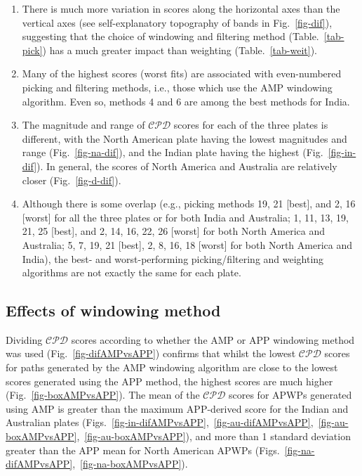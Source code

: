 \begin{enumerate}
  \item There is much more variation in scores along the horizontal axes than
	the vertical axes (see self-explanatory topography of bands in
	Fig.~\ref{fig-dif}), suggesting that the choice of windowing and filtering
	method (Table.~\ref{tab-pick}) has a much greater impact than weighting
	(Table.~\ref{tab-weit}).
  \item Many of the highest scores (worst fits) are associated with
	even-numbered picking and filtering methods, i.e., those which use the AMP
	windowing algorithm. Even so, methods 4 and 6 are among the best methods for
	India.
  \item The magnitude and range of $\mathcal{CPD}$ scores for each of the three
	plates is different, with the North American plate having the lowest
	magnitudes and range (Fig.~\ref{fig-na-dif}), and the Indian plate having
	the highest (Fig.~\ref{fig-in-dif}). In general, the scores of North America
	and Australia are relatively closer (Fig.~\ref{fig-d-dif}).
  \item Although there is some overlap (e.g., picking methods 19, 21 [best], and
	2, 16 [worst] for all the three plates or for both India and Australia; 1,
	11, 13, 19, 21, 25 [best], and 2, 14, 16, 22, 26 [worst] for both North
	America and Australia; 5, 7, 19, 21 [best], 2, 8, 16, 18 [worst] for both
	North America and India), the best- and worst-performing picking/filtering
	and weighting algorithms are not exactly the same for each plate.
\end{enumerate}

\subsection{Effects of windowing method}

Dividing $\mathcal{CPD}$ scores according to whether the AMP or APP windowing
method was used (Fig.~\ref{fig-difAMPvsAPP}) confirms that whilst the lowest
$\mathcal{CPD}$ scores for paths generated by the AMP windowing algorithm are
close to the lowest scores generated using the APP method, the highest scores
are much higher (Fig.~\ref{fig-boxAMPvsAPP}). The mean of the $\mathcal{CPD}$
scores for APWPs generated using AMP is greater than the maximum APP-derived
score for the Indian and Australian plates
(Figs.~\ref{fig-in-difAMPvsAPP},~\ref{fig-au-difAMPvsAPP},~\ref{fig-au-boxAMPvsAPP},~\ref{fig-au-boxAMPvsAPP}),
and more than 1 standard deviation greater than the APP mean for North American
APWPs (Figs.~\ref{fig-na-difAMPvsAPP},~\ref{fig-na-boxAMPvsAPP}).

